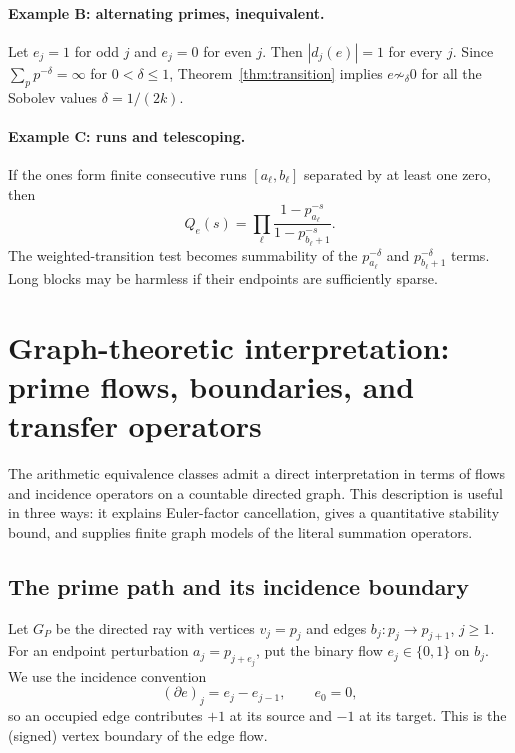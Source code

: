 \documentclass[12pt,letterpaper]{article}
\numberwithin{equation}{section}
\theoremstyle{remark}
\begin{document}
\paragraph{Example B: alternating primes, inequivalent.}
Let $e_j=1$ for odd $j$ and $e_j=0$ for even $j$. Then $|d_j(e)|=1$ for every $j$. Since $\sum_p p^{-\delta}=\infty$ for $0<\delta\le1$, Theorem~\ref{thm:transition} implies $e\not\sim_\delta0$ for all the Sobolev values $\delta=1/(2k)$.

\paragraph{Example C: runs and telescoping.}
If the ones form finite consecutive runs $[a_\ell,b_\ell]$ separated by at least one zero, then
\[
 Q_e(s)=\prod_\ell\frac{1-p_{a_\ell}^{-s}}{1-p_{b_\ell+1}^{-s}}.
\]
The weighted-transition test becomes summability of the $p_{a_\ell}^{-\delta}$ and $p_{b_\ell+1}^{-\delta}$ terms. Long blocks may be harmless if their endpoints are sufficiently sparse.


\section[Graph flows and transfer operators]{Graph-theoretic interpretation: prime flows, boundaries, and transfer operators}\label{sec:graph}
\label{sec:prime-graphs}

The arithmetic equivalence classes admit a direct interpretation in terms of
flows and incidence operators on a countable directed graph.  This description
is useful in three ways: it explains Euler-factor cancellation, gives a
quantitative stability bound, and supplies finite graph models of the
literal summation operators.

\subsection{The prime path and its incidence boundary}

Let \(G_P\) be the directed ray with vertices \(v_j=p_j\) and edges
\(b_j:p_j\to p_{j+1}\), \(j\ge1\).  For an endpoint perturbation
\(a_j=p_{j+e_j}\), put the binary flow \(e_j\in\{0,1\}\) on \(b_j\).
We use the incidence convention
\[
 (\partial e)_j=e_j-e_{j-1},\qquad e_0=0,
\]
so an occupied edge contributes \(+1\) at its source and \(-1\) at its
target.  This is the (signed) vertex boundary of the edge flow.

\begin{center}
\end{center}
\end{document}
